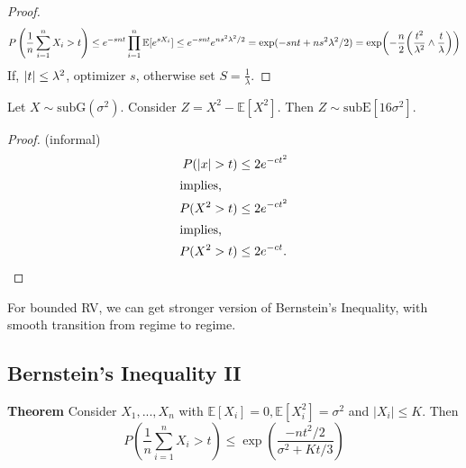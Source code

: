 \documentclass[11pt]{article}
\begin{document}
\begin{proof}
\begin{align*}
P\left(\frac{1}{n}\sum_{i=1}^n X_i>t\right)\le e^{-snt}\prod_{i=1}^n \mathbb{E}[e^{sX_i}]\le e^{-snt}e^{ns^2\lambda^2/2}=\exp(-snt+ns^2\lambda^2/2)=\exp\prn*{-\frac{n}{2} \prn*{\frac{t^2}{\lambda^2}\wedge \frac{t}{\lambda}}}
\end{align*}
If, $\abs*{t} \leq \lambda^2$, optimizer $s$, otherwise set $S = \frac{1}{\lambda}$.

\end{proof}


\begin{lemma} \label{lem: subgaussian_to_subexponential}
 Let $X\sim \text{subG}(\sigma^2)$. Consider $Z=X^2-\mathbb{E}[X^2]$. Then $Z\sim \text{subE}[16\sigma^2]$. 
\end{lemma}
 \begin{proof}{(informal)}
 \begin{align*}
P(|x|>t) &\le 2e^{-ct^2}\\
\intertext{implies,} P(X^2>t) &\le 2e^{-ct^2} \\ 
\intertext{implies,}
P(X^2>t) &\le 2e^{-ct}.
\end{align*}
\end{proof}

For bounded RV, we can get stronger version of Bernstein's Inequality, with smooth transition from regime to regime.

\subsection{Bernstein's Inequality II}
\textbf{Theorem}
Consider $X_1, ..., X_n$ with $\mathbb{E}[X_i]=0, \mathbb{E}[X_i^2]=\sigma^2$ and $|X_i|\le K$. Then 
\[P\left(\frac{1}{n}\sum_{i=1}^n X_i>t\right)\le \exp\left(\frac{-nt^2/2}{\sigma^2+Kt/3}\right)\]
\end{document}
